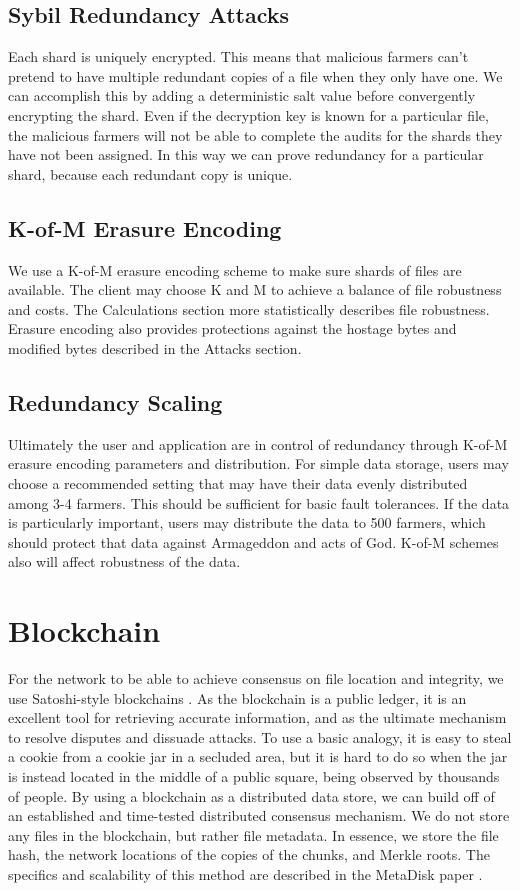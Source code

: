 \documentclass[a4paper,10pt]{article}
\begin{document}
\subsection{Sybil Redundancy Attacks}
Each shard is uniquely encrypted. This means that malicious farmers can’t pretend to have multiple redundant copies of a file when they only have one. We can accomplish this by adding a deterministic salt value before convergently encrypting the shard. Even if the decryption key is known for a particular file, the malicious farmers will not be able to complete the audits for the shards they have not been assigned. In this way we can prove redundancy for a particular shard, because each redundant copy is unique.\\

\subsection{K-of-M Erasure Encoding}
We use a K-of-M erasure encoding scheme to make sure shards of files are available. The client may choose K and M to achieve a balance of file robustness and costs. The Calculations section more statistically describes file robustness. Erasure encoding also provides protections against the hostage bytes and modified bytes described in the Attacks section.\\

\subsection{Redundancy Scaling}
Ultimately the user and application are in control of redundancy through K-of-M erasure encoding parameters and distribution. For simple data storage, users may choose a recommended setting that may have their data evenly distributed among 3-4 farmers. This should be sufficient for basic fault tolerances. If the data is particularly important, users may distribute the data to 500 farmers, which should protect that data against Armageddon and acts of God. K-of-M schemes also will affect robustness of the data. 

\section{Blockchain}
For the network to be able to achieve consensus on file location and integrity, we use Satoshi-style blockchains \cite{3}. As the blockchain is a public ledger, it is an excellent tool for retrieving accurate information, and as the ultimate mechanism to resolve disputes and dissuade attacks. To use a basic analogy, it is easy to steal a cookie from a cookie jar in a secluded area, but it is hard to do so when the jar is instead located in the middle of a public square, being observed by thousands of people. By using a blockchain as a distributed data store, we can build off of an established and time-tested distributed consensus mechanism. We do not store any files in the blockchain, but rather file metadata. In essence, we store the file hash, the network locations of the copies of the chunks, and Merkle roots. The specifics and scalability of this method are described in the MetaDisk paper \cite{1}.  \\
\end{document}
